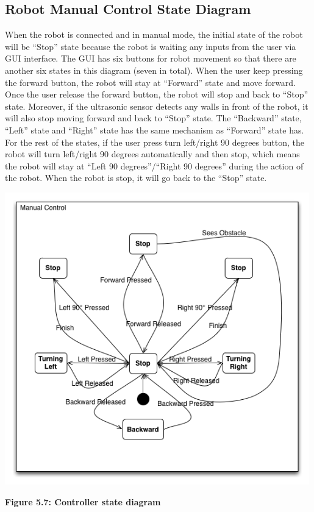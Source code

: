 \documentclass[11pt, a4paper]{report}
\begin{document}
\subsection{  Robot Manual Control State Diagram}
When the robot is connected and in manual mode, the initial state of the robot will be ``Stop'' state because the robot is waiting any inputs from the user via GUI interface. The GUI has six buttons for robot movement so that there are another six states in this diagram (seven in total).  When the user keep pressing the forward button, the robot will stay at ``Forward'' state and move forward. Once the user release the forward button, the robot will stop and back to ``Stop'' state. Moreover, if the ultrasonic sensor detects any walls in front of the robot, it will also stop moving forward and back to ``Stop'' state. The ``Backward'' state, ``Left'' state and ``Right'' state has the same mechanism as ``Forward'' state has. For the rest of the states, if the user press turn left/right 90 degrees button, the robot will turn left/right 90 degrees automatically and then stop, which means the robot will stay at ``Left 90 degrees''/``Right 90 degrees'' during the action of the robot. When the robot is stop, it will go back to the ``Stop'' state.
 \begin{center}
 \includegraphics[width=13.20cm]{RobotManualControl.png}
\end{center}
\begin{center}
\textbf {Figure 5.7: Controller state diagram} \\[0.3cm]
\end{center}
\pagebreak
\end{document}
